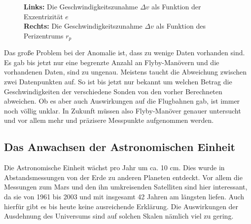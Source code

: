 \begin{figure}[htb]
\begin{center}
\noindent    
{}
\end{center}
\vskip -10pt
  \caption{{\bf Links:} Die Geschwindigkeitszunahme $\Delta v$ als Funktion der Exzentrizität $e$ \\
{\bf Rechts:} Die Geschwindigkeitszunahme $\Delta v$ als Funktion des Perizentrums $r_p$\cite{Turyshev2004}}
\label{fig:dia}
\end{figure} 


Das gro{\ss}e Problem bei der Anomalie ist, dass zu wenige Daten
vorhanden sind. Es gab bis jetzt nur eine begrenzte Anzahl an
Flyby-Man\"overn und die vorhandenen Daten, sind zu ungenau. 
Meistens taucht die Abweichung zwischen zwei Datenpunkten auf. So ist bis
jetzt nur bekannt um welchen Betrag die Geschwindigkeiten der
verschiedene Sonden von den vorher Berechneten abweichen. Ob es aber
auch Auswirkungen auf die Flugbahnen gab, ist immer noch v\"ollig
unklar. In Zukunft m\"ussen also Flyby-Man\"over genauer untersucht und
vor allem mehr und pr\"azisere Messpunkte aufgenommen werden.

\subsection{Das Anwachsen der Astronomischen Einheit}


Die Astronomische Einheit w\"achst pro Jahr um ca. 10 cm. Dies wurde in
Abstandsmessungen von der Erde zu anderen Planeten entdeckt. Vor allem
die Messungen zum Mars und den ihn umkreisenden Satelliten sind hier
interessant, da sie von 1961 bis 2003 und mit insgesamt 42 Jahren am
l\"angsten liefen. Auch hierf\"ur gibt es bis heute keine ausreichende
Erkl\"arung. Die Auswirkungen der Ausdehnung des Universums sind auf
solchen Skalen n\"amlich viel zu gering.

